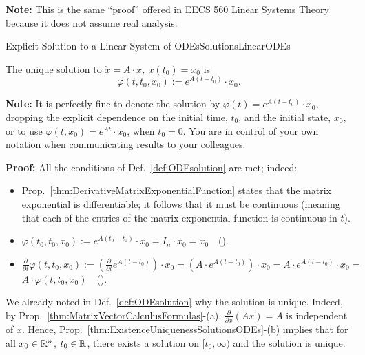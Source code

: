 \textbf{Note:} This is the same ``proof'' offered in EECS 560 Linear Systems Theory because it does not assume real analysis. 
\Qed

\vspace{.2cm}

\begin{propColor}{Explicit Solution to a Linear System of ODEs}{SolutionsLinearODEs}

The unique solution to $\dot{x} = A \cdot x, ~x(t_0) = x_0$ is
\begin{equation}
\label{eq:MatrixExponentialSolutionODE}
\varphi(t, t_0,x_0):= e^{A(t-t_0)} \cdot x_0.
\end{equation} 

\bigskip
\textbf{Note:} It is perfectly fine to denote the solution by $\varphi(t)= e^{A(t-t_0)} \cdot x_0$, dropping the explicit dependence on the initial time, $t_0$, and the initial state, $x_0$, or to use $\varphi(t, x_0)= e^{A t} \cdot x_0$, when $t_0=0$. You are in control of your own notation when communicating results to your colleagues.
\end{propColor}

\bigskip
\textbf{Proof:} All the conditions of Def.~\ref{def:ODEsolution} are met; indeed:
\begin{itemize}
    \item  Prop.~\ref{thm:DerivativeMatrixExponentialFunction} states that the matrix exponential is differentiable; it follows that it must be continuous (meaning that each of the entries of the matrix exponential function is continuous in $t$). 
    \item $\varphi(t_0, t_0, x_0):= e^{A(t_0-t_0)} \cdot x_0 = I_n \cdot x_0 = x_0 $~~().
    \item $\frac{\partial }{ \partial t} \varphi(t, t_0, x_0):= \left(\frac{\partial }{ \partial t} e^{A(t-t_0)} \right) \cdot x_0 = \left(A \cdot e^{A(t-t_0)} \right) \cdot x_0 = A \cdot e^{A(t-t_0)}\cdot x_0 =$ 
    ${ A \cdot \varphi(t, t_0, x_0)}$~~(). 
\end{itemize}

We already noted in Def.~\ref{def:ODEsolution} why the solution is unique. Indeed, by Prop.~\ref{thm:MatrixVectorCalculusFormulas}-(a), $\frac{\partial}{\partial x} \left( Ax \right) = A$ is independent of $x$. Hence, Prop.~\ref{thm:ExistenceUniquenessSolutionsODEs}-(b) implies that for all $x_0\in \mathbb R^n$, $t_0\in \mathbb R$, there exists a solution on $[t_0, \infty)$ and the solution is unique.  
\Qed

